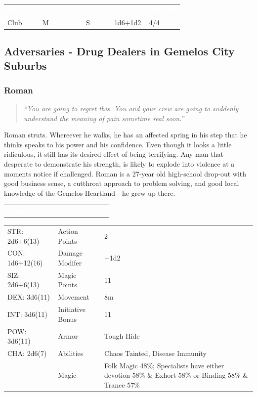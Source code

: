 \documentclass[letterpaper,serif]{rpg-module}
\begin{document}
\begin{tabularx}{\linewidth}{XXXXX}
\rowcolor{gray}
\textcolor{white}{\textbf{Weapon}} & \textcolor{white}{\textbf{Size/Force}} & \textcolor{white}{\textbf{Reach}} & \textcolor{white}{\textbf{Damage}} & \textcolor{white}{\textbf{AP/HP}} \\
Club & M & S & 1d6+1d2 & 4/4
\end{tabularx}

\subsection{Adversaries - Drug Dealers in Gemelos City Suburbs}

\subsubsection{Roman}

\begin{quote}
\emph{``You are going to regret this. You and your crew are going to suddenly understand the meaning of pain sometime real soon.''}
\end{quote}

\vspace{-12pt}

Roman struts. Whereever he walks, he has an affected spring in his step that he thinks speaks to his power and his confidence. Even though it looks a little ridiculous, it still has its desired effect of being terrifying. Any man that desperate to demonstrate his strength, is likely to explode into violence at a moments notice if challenged. Roman is a 27-year old high-school drop-out with good business sense, a cutthroat approach to problem solving, and good local knowledge of the Gemelos Heartland - he grew up there. 

\noindent\begin{tabularx}{\linewidth}{X}
\rowcolor{gray}
\textcolor{white}{\textbf{Roman Davis - Drug Dealer}}
\end{tabularx}
\begin{tabularx}{\linewidth}{XXX}
STR: 2d6+6(13) & Action Points & 2 \\
CON: 1d6+12(16) & Damage Modifer & +1d2 \\
SIZ: 2d6+6(13) & Magic Points & 11 \\
DEX: 3d6(11) & Movement & 8m \\
INT: 3d6(11) & Initiative Bonus & 11 \\
POW: 3d6(11) & Armor & Tough Hide \\
CHA: 2d6(7) & Abilities & Chaos Tainted, Disease Immunity \\
    & Magic & Folk Magic 48\%; Specialists have either devotion 58\% \& Exhort 58\% or Binding 58\% \& Trance 57\%
\end{tabularx}
\end{document}
